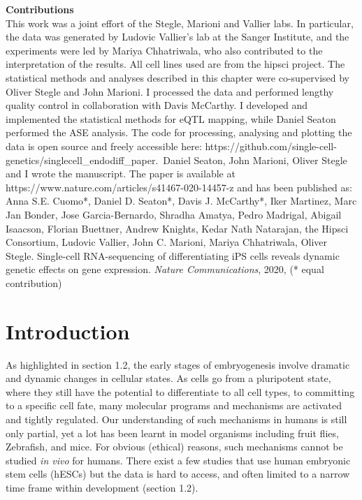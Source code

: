 \begin{Comment2}
\hspace{-3mm}\textbf{Contributions} \\
This work was a joint effort of the Stegle, Marioni and Vallier labs. 
In particular, the data was generated by Ludovic Vallier’s lab at the Sanger Institute, and the experiments were led by Mariya Chhatriwala, who also contributed to the interpretation of the results. 
All cell lines used are from the \gls{hipsci} project.
The statistical methods and analyses described in this chapter were co-supervised by Oliver Stegle and John Marioni. 
I processed the data and performed lengthy quality control in collaboration with Davis McCarthy. 
I developed and implemented the statistical methods for eQTL mapping, while
Daniel Seaton performed the ASE analysis.
The code for processing, analysing and plotting the data is open source and freely accessible here: https://github.com/single-cell-genetics/singlecell\_endodiff\_paper.\
Daniel Seaton, John Marioni, Oliver Stegle and I wrote the manuscript. 
The paper \cite{cuomo2020single} is available at https://www.nature.com/articles/s41467-020-14457-z and has been published as:\\

Anna S.E. Cuomo*, Daniel D. Seaton*, Davis J. McCarthy*, Iker Martinez, Marc Jan Bonder, Jose Garcia-Bernardo, Shradha Amatya, Pedro Madrigal, Abigail Isaacson, Florian Buettner, Andrew Knights, Kedar Nath Natarajan, the Hipsci Consortium, Ludovic Vallier, John C. Marioni, Mariya Chhatriwala, Oliver Stegle. Single-cell RNA-sequencing of differentiating iPS cells reveals dynamic genetic effects on gene expression. \textit{Nature Communications}, 2020, (* equal contribution)

\end{Comment2}

\newpage

\section{Introduction}

As highlighted in section 1.2, the early stages of embryogenesis involve dramatic and dynamic changes in cellular states. 
As cells go from a pluripotent state, where they still have the potential to differentiate to all cell types, to committing to a specific cell fate, many molecular programs and mechanisms are activated and tightly regulated.
Our understanding of such mechanisms in humans is still only partial, yet a lot has been learnt in model organisms including fruit flies, Zebrafish, and mice. 
For obvious (ethical) reasons, such mechanisms cannot be studied \textit{in vivo} for humans. 
There exist a few studies that use human embryonic stem cells (hESCs) but the data is hard to access, and often limited to a narrow time frame within development (section 1.2). \\

